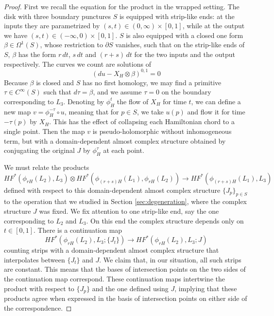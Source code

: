 \documentclass[12pt]{amsart}
\begin{document}
\begin{proof}
  First we recall the equation for the product in the wrapped setting. The disk with three boundary punctures $S$ is equipped with strip-like ends: at the inputs they are parametrized by $(s,t) \in (0,\infty)\times [0,1]$, while at the output we have $(s,t) \in (-\infty,0)\times [0,1]$. $S$ is also equipped with a closed one form $\beta \in \Omega^1(S)$, whose restriction to $\partial S$ vanishes,  such that on the strip-like ends of $S$, $\beta$ has the form $r\,dt$, $s\,dt$ and $(r+s)\,dt$ for the two inputs and the output respectively. The curves we count are solutions of 
  \begin{equation}
    (du - X_H \otimes \beta)^{0,1} = 0
  \end{equation}
  Because $\beta$ is closed and $S$ has no first homology, we may find a primitive $\tau \in C^\infty(S)$ such that $d \tau = \beta$, and we assume $\tau = 0$ on the boundary corresponding to $L_3$.  Denoting by $\phi^t_H$ the flow of $X_H$ for time $t$, we can define a new map $v = \phi^{-\tau}_H \circ u$, meaning that for $p \in S$, we take $u(p)$ and flow it for time $-\tau(p)$ by $X_H$. This has the effect of collapsing each Hamiltonian chord to a single point. Then the map $v$ is pseudo-holomorphic without inhomogeneous term, but with a domain-dependent almost complex structure obtained by conjugating the original $J$ by $\phi_H^\tau$ at each point.

We must relate the products \begin{equation}
  HF^*(\phi_{rH}(L_2),L_3) \otimes
  HF^*(\phi_{(r+s)H}(L_1),\phi_{rH}(L_2)) \to HF^*(\phi_{(r+s)H}(L_1),L_3)
\end{equation}
defined with respect to this domain-dependent almost complex structure $\{J_p\}_{p\in S}$ to the operation that we studied in Section \ref{sec:degeneration}, where the complex structure $J$ was fixed. We fix attention to one strip-like end, say the one corresponding to $L_2$ and $L_3$. On this end the complex structure depends only on $t \in [0,1]$. There is a continuation map 
\begin{equation}
HF^*(\phi_{rH}(L_2),L_3;\{J_t\}) \to HF^*(\phi_{rH}(L_2),L_3;J)  
\end{equation}
counting strips with a domain-dependent almost complex structure that interpolates between $\{J_t\}$ and $J$. We claim that, in our situation, all such strips are constant. This means that the bases of intersection points on the two sides of the continuation map correspond. These continuation maps intertwine the product with respect to $\{J_p\}$ and the one defined using $J$, implying that these products agree when expressed in the basis of intersection points on either side of the correspondence.


\end{proof}
\end{document}
